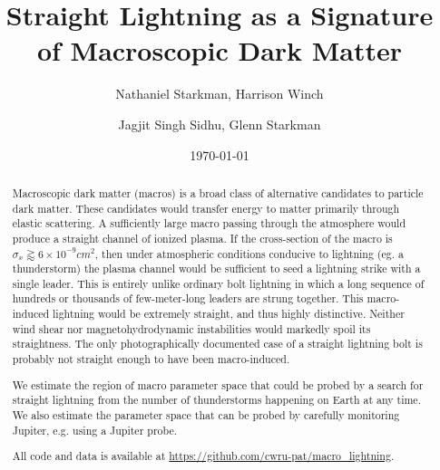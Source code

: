 \documentclass[%
 reprint,
 amsmath,amssymb,
 aps,
]{revtex4-2}
\newcommand{\vtwo}[1]{{\color{black} #1}}
\begin{document}

\title{Straight Lightning as a Signature of Macroscopic Dark Matter}

\author{Nathaniel Starkman, Harrison Winch}%
%

\author{Jagjit Singh Sidhu, Glenn Starkman}

\date{\today}


\begin{abstract}

    Macroscopic dark matter (macros) is a broad class of alternative candidates to particle dark matter. These candidates would transfer energy to matter primarily through elastic scattering. A sufficiently large macro passing through the atmosphere would produce a straight channel of ionized plasma. If the cross-section of the macro is $\sigma_x\gtrapprox6\times10^{-9}cm^2$, then under atmospheric conditions conducive to lightning (eg. a thunderstorm) the plasma channel would be sufficient to seed a lightning strike with a single leader. This is entirely unlike ordinary bolt lightning in which a long sequence of hundreds or thousands of few-meter-long leaders are strung together. This macro-induced lightning would be extremely straight, and thus highly distinctive. Neither wind shear nor magnetohydrodynamic instabilities would markedly spoil its straightness. The only photographically documented case of a straight lightning bolt is probably not straight enough to have been macro-induced.

    We estimate the region of macro parameter space that could be probed by a search for straight lightning from the number of thunderstorms happening on Earth at any time. We also estimate the parameter space that can be probed by carefully monitoring Jupiter, e.g. \vtwo{using a Jupiter probe}.

    All code and data is available at \url{https://github.com/cwru-pat/macro_lightning}.

\end{abstract}
\end{document}
